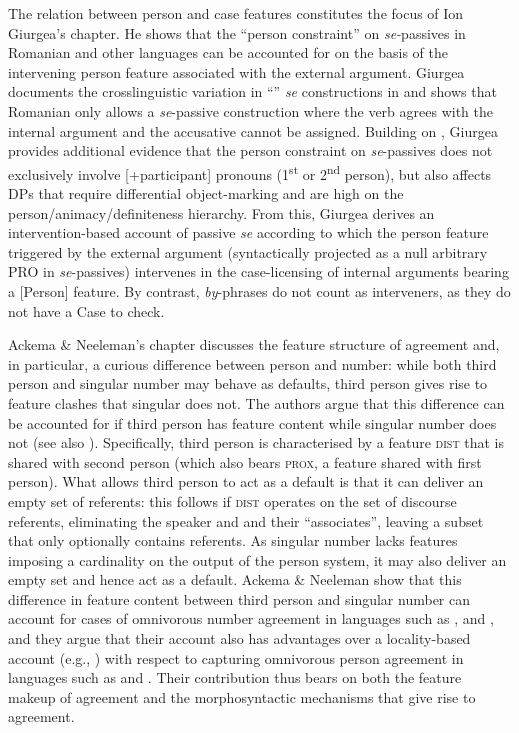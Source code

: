 \documentclass[output=paper]{langsci/langscibook}
\begin{document}
The relation between person and case features constitutes the focus of Ion Giurgea’s chapter. He shows that the ``person constraint'' on \textit{se-}passives in Romanian and other  languages can be accounted for on the basis of the intervening person feature associated with the external argument. Giurgea documents the crosslinguistic variation in ``'' \textit{se} constructions in  and shows that Romanian only allows a \textit{se}{}-passive construction where the verb agrees with the internal argument and the accusative cannot be assigned. Building on \citet{Cornilescu1998}, Giurgea provides additional evidence that the person constraint on \textit{se}-passives does not exclusively involve [+participant] pronouns (1\textsuperscript{st} or 2\textsuperscript{nd} person), but also affects DPs that require differential object-marking and are high on the person\slash animacy\slash definiteness hierarchy. From this, Giurgea derives an intervention-based account of passive \textit{se} according to which the person feature triggered by the external argument (syntactically projected as a null arbitrary PRO in \textit{se}{}-passives) intervenes in the case-licensing of internal arguments bearing a [Person] feature. By contrast, \textit{by}{}-phrases do not count as interveners, as they do not have a Case to check.

Ackema \& Neeleman’s chapter discusses the feature structure of agreement and, in particular, a curious difference between person and number: while both third person and singular number may behave as defaults, third person gives rise to feature clashes that singular does not. The authors argue that this difference can be accounted for if third person has feature content while singular number does not (see also \citealt{Nevins2007,Nevins2011}). Specifically, third person is characterised by a feature \textsc{dist} that is shared with second person (which also bears \textsc{prox}, a feature shared with first person). What allows third person to act as a default is that it can deliver an empty set of referents: this follows if \textsc{dist} operates on the set of discourse referents, eliminating the speaker and  and their ``associates'', leaving a subset that only optionally contains referents. As singular number lacks features imposing a cardinality on the output of the person system, it may also deliver an empty set and hence act as a default. Ackema \& Neeleman show that this difference in feature content between third person and singular number can account for cases of omnivorous number agreement in languages such as ,  and , and they argue that their account also has advantages over a locality-based  account (e.g., \citealt{Preminger2014}) with respect to capturing omnivorous person agreement in languages such as  and . Their contribution thus bears on both the feature makeup of agreement and the morphosyntactic mechanisms that give rise to agreement.
\end{document}

